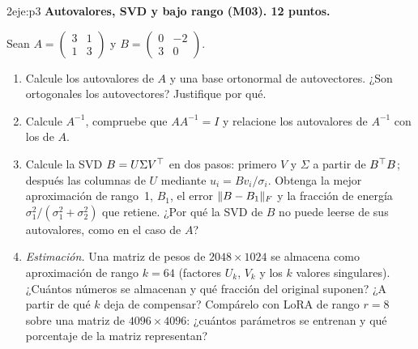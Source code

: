 \begin{ejercicio}{2}{eje:p3}
\textbf{Autovalores, SVD y bajo rango (M03). 12 puntos.}

Sean $A=\begin{pmatrix}3&1\\1&3\end{pmatrix}$ y $B=\begin{pmatrix}0&-2\\3&0\end{pmatrix}$.
\begin{enumerate}[label=(\alph*)]
  \item {} Calcule los autovalores de $A$ y una base ortonormal de autovectores. ¿Son ortogonales los autovectores? Justifique por qué.
  \item {} Calcule $A^{-1}$, compruebe que $AA^{-1}=I$ y relacione los autovalores de $A^{-1}$ con los de $A$.
  \item {} Calcule la SVD $B=U\Sigma V^{\top}$ en dos pasos: primero $V$ y $\Sigma$ a partir de $B^{\top} B$; después las columnas de $U$ mediante $u_i=Bv_i/\sigma_i$. Obtenga la mejor aproximación de rango~1, $B_1$, el error $\lVert B-B_1\rVert_F$ y la fracción de energía $\sigma_1^{2}/(\sigma_1^{2}+\sigma_2^{2})$ que retiene. ¿Por qué la SVD de $B$ no puede leerse de sus autovalores, como en el caso de $A$?
  \item {} \emph{Estimación.} Una matriz de pesos de $2048\times 1024$ se almacena como aproximación de rango $k=64$ (factores $U_k$, $V_k$ y los $k$ valores singulares). ¿Cuántos números se almacenan y qué fracción del original suponen? ¿A partir de qué $k$ deja de compensar? Compárelo con LoRA de rango $r=8$ sobre una matriz de $4096\times 4096$: ¿cuántos parámetros se entrenan y qué porcentaje de la matriz representan?
\end{enumerate}
\end{ejercicio}

